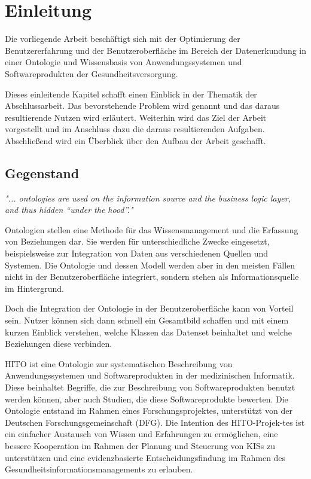 \chapter{Einleitung}\label{ch:introduction}

Die vorliegende Arbeit beschäftigt sich mit der Optimierung der Benutzererfahrung und der Benutzeroberfläche im Bereich der Datenerkundung in einer Ontologie und Wissensbasis von Anwendungssystemen und Softwareprodukten der Gesundheitsversorgung.

Dieses einleitende Kapitel schafft einen Einblick in der Thematik der Abschlussarbeit. 
Das bevorstehende Problem wird genannt und das daraus resultierende Nutzen wird erläutert. 
Weiterhin wird das Ziel der Arbeit vorgestellt und im Anschluss dazu die daraus resultierenden Aufgaben. 
Abschließend wird ein Überblick über den Aufbau der Arbeit geschafft.

\section{Gegenstand}\label{sec:gegenstand}

\begin{center}
\textit{"... ontologies are used on the information source and the business logic layer, and thus hidden “under the hood”."}
\end{center}

\begin{flushright}
\textit{ \textendash{} \citep{paulheim2010ontology}} \newline
\end{flushright}

Ontologien stellen eine Methode für das Wissensmanagement und die Erfassung von Beziehungen dar.
Sie werden für unterschiedliche Zwecke eingesetzt, beispielsweise zur Integration von Daten aus verschiedenen Quellen und Systemen.
Die Ontologie und dessen Modell werden aber in den meisten Fällen nicht in der Benutzeroberfläche integriert, sondern stehen als Informationsquelle im Hintergrund. \citep[vgl.]{paulheim2010ontology}

Doch die Integration der Ontologie in der Benutzeroberfläche kann von Vorteil sein. 
Nutzer können sich dann schnell ein Gesamtbild schaffen und mit einem kurzen Einblick verstehen, welche Klassen das Datenset beinhaltet und welche Beziehungen diese verbinden. \citep[vgl.]{linkeddatavisualization}

\ac{HITO} ist eine Ontologie zur systematischen Beschreibung von Anwendungssystemen und Softwareprodukten in der medizinischen Informatik.
Diese beinhaltet Begriffe, die zur Beschreibung von Softwareprodukten benutzt werden können, aber auch Studien, die diese Softwareprodukte bewerten.
Die Ontologie entstand im Rahmen eines Forschungsprojektes, unterstützt von der Deutschen Forschungsgemeinschaft (\acs{DFG}).
Die Intention des HITO-Projek-tes ist ein einfacher Austausch von Wissen und Erfahrungen zu ermöglichen, eine bessere Kooperation im Rahmen der Planung und Steuerung von \acp{KIS} zu unterstützen und eine evidenzbasierte Entscheidungsfindung im Rahmen des Gesundheitsinformationsmanagements zu erlauben.

